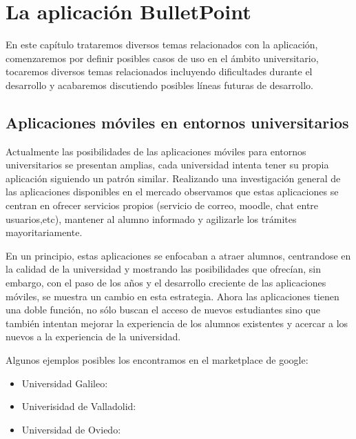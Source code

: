 %
%
%

\chapter{La aplicación BulletPoint} \label{chap:LaAplicacion} 

En este capítulo trataremos diversos temas relacionados con la aplicación, comenzaremos por definir posibles casos de uso en el ámbito universitario, tocaremos diversos temas relacionados incluyendo dificultades durante el desarrollo y acabaremos discutiendo posibles líneas futuras de desarrollo.

 
\section{Aplicaciones móviles en entornos universitarios}


Actualmente las posibilidades de las aplicaciones móviles para entornos universitarios se presentan amplias, cada universidad intenta tener su propia aplicación siguiendo un patrón similar. Realizando una investigación general de las aplicaciones disponibles en el mercado observamos que estas aplicaciones se centran en ofrecer servicios propios (servicio de correo, moodle, chat entre usuarios,etc), mantener al alumno informado y agilizarle los trámites mayoritariamente. 

En un principio, estas aplicaciones se enfocaban a atraer alumnos, centrandose en la calidad de la universidad y mostrando las posibilidades que ofrecían, sin embargo, con el paso de los años y el desarrollo creciente de las aplicaciones móviles, se muestra un cambio en esta estrategia. Ahora las aplicaciones tienen una doble función, no sólo buscan el acceso de nuevos estudiantes sino que también intentan mejorar la experiencia de los alumnos existentes y acercar a los nuevos a la experiencia de la universidad. 


Algunos ejemplos posibles los encontramos en el marketplace de google:

\begin{itemize}
\item Universidad Galileo: \cite{URL::galileo}
\item Univerisidad de Valladolid: \cite{URL::valladolid}
\item Universidad de Oviedo: \cite{URL::oviedo}
\end{itemize}



